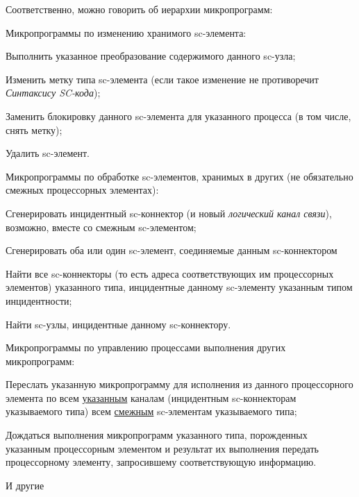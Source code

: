 Соответственно, можно говорить об иерархии микропрограмм:
\begin{textitemize}
	\item Микропрограммы по изменению хранимого sc-элемента:
	\begin{textitemize}
		\item \item Выполнить указанное преобразование содержимого данного sc-узла;
		\item Изменить метку типа sc-элемента (если такое изменение не противоречит \textit{Синтаксису SC-кода});
		\item Заменить блокировку данного sc-элемента для указанного процесса (в том числе, снять метку);
		\item Удалить sc-элемент.
	\end{textitemize}
	\item Микропрограммы по обработке sc-элементов, хранимых в других (не обязательно смежных процессорных элементах):
	\begin{textitemize}
		\item Сгенерировать инцидентный sc-коннектор (и новый \textit{логический канал связи}), возможно, вместе со смежным sc-элементом;
		\item Сгенерировать оба или один sc-элемент, соединяемые данным sc-коннектором
		\item Найти все sc-коннекторы (то есть адреса соответствующих им процессорных элементов) указанного типа, инцидентные данному sc-элементу указанным типом инцидентности;
		\item Найти sc-узлы, инцидентные данному sc-коннектору.
	\end{textitemize}
	\item Микропрограммы по управлению процессами выполнения других микропрограмм:
	\begin{textitemize}
		\item Переслать указанную микропрограмму для исполнения из данного процессорного элемента по всем \underline{указанным} каналам (инцидентным sc-коннекторам указываемого типа) всем \underline{смежным} sc-элементам указываемого типа;
		\item Дождаться выполнения микропрограмм указанного типа, порожденных указанным процессорным элементом и результат их выполнения передать процессорному элементу, запросившему соответствующую информацию.
	\end{textitemize}
	\item И другие
\end{textitemize}

